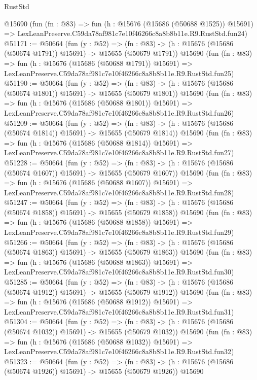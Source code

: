 \begin{lexlean}{RustStd}
\begin{coremodule}
    @15690
    (fun (fn : @83) =>
    fun (h : @15676 (@15686 (@50688 @1525)) @15691) =>
    LexLeanPreserve.C59da78af981c7e10f46266c8a8b8b11e.R9.RustStd.fun24)
@51171 := @50664
    (fun (y : @52) =>
    (fn : @83) -> (h : @15676 (@15686 (@50674 @1791)) @15691) -> @15655 (@50679 @1791))
    @15690
    (fun (fn : @83) =>
    fun (h : @15676 (@15686 (@50688 @1791)) @15691) =>
    LexLeanPreserve.C59da78af981c7e10f46266c8a8b8b11e.R9.RustStd.fun25)
@51190 := @50664
    (fun (y : @52) =>
    (fn : @83) -> (h : @15676 (@15686 (@50674 @1801)) @15691) -> @15655 (@50679 @1801))
    @15690
    (fun (fn : @83) =>
    fun (h : @15676 (@15686 (@50688 @1801)) @15691) =>
    LexLeanPreserve.C59da78af981c7e10f46266c8a8b8b11e.R9.RustStd.fun26)
@51209 := @50664
    (fun (y : @52) =>
    (fn : @83) -> (h : @15676 (@15686 (@50674 @1814)) @15691) -> @15655 (@50679 @1814))
    @15690
    (fun (fn : @83) =>
    fun (h : @15676 (@15686 (@50688 @1814)) @15691) =>
    LexLeanPreserve.C59da78af981c7e10f46266c8a8b8b11e.R9.RustStd.fun27)
@51228 := @50664
    (fun (y : @52) =>
    (fn : @83) -> (h : @15676 (@15686 (@50674 @1607)) @15691) -> @15655 (@50679 @1607))
    @15690
    (fun (fn : @83) =>
    fun (h : @15676 (@15686 (@50688 @1607)) @15691) =>
    LexLeanPreserve.C59da78af981c7e10f46266c8a8b8b11e.R9.RustStd.fun28)
@51247 := @50664
    (fun (y : @52) =>
    (fn : @83) -> (h : @15676 (@15686 (@50674 @1858)) @15691) -> @15655 (@50679 @1858))
    @15690
    (fun (fn : @83) =>
    fun (h : @15676 (@15686 (@50688 @1858)) @15691) =>
    LexLeanPreserve.C59da78af981c7e10f46266c8a8b8b11e.R9.RustStd.fun29)
@51266 := @50664
    (fun (y : @52) =>
    (fn : @83) -> (h : @15676 (@15686 (@50674 @1863)) @15691) -> @15655 (@50679 @1863))
    @15690
    (fun (fn : @83) =>
    fun (h : @15676 (@15686 (@50688 @1863)) @15691) =>
    LexLeanPreserve.C59da78af981c7e10f46266c8a8b8b11e.R9.RustStd.fun30)
@51285 := @50664
    (fun (y : @52) =>
    (fn : @83) -> (h : @15676 (@15686 (@50674 @1912)) @15691) -> @15655 (@50679 @1912))
    @15690
    (fun (fn : @83) =>
    fun (h : @15676 (@15686 (@50688 @1912)) @15691) =>
    LexLeanPreserve.C59da78af981c7e10f46266c8a8b8b11e.R9.RustStd.fun31)
@51304 := @50664
    (fun (y : @52) =>
    (fn : @83) -> (h : @15676 (@15686 (@50674 @1032)) @15691) -> @15655 (@50679 @1032))
    @15690
    (fun (fn : @83) =>
    fun (h : @15676 (@15686 (@50688 @1032)) @15691) =>
    LexLeanPreserve.C59da78af981c7e10f46266c8a8b8b11e.R9.RustStd.fun32)
@51323 := @50664
    (fun (y : @52) =>
    (fn : @83) -> (h : @15676 (@15686 (@50674 @1926)) @15691) -> @15655 (@50679 @1926))
    @15690

\end{coremodule}
\end{lexlean}
